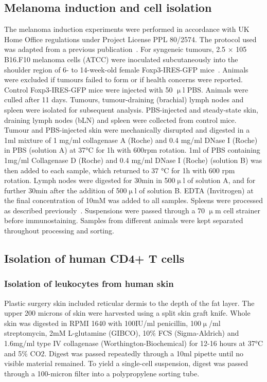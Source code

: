 \subsection{Melanoma induction and cell isolation}	
The melanoma induction experiments were performed in accordance with UK Home Office regulations under Project License PPL 80/2574. The protocol used was adapted from a previous publication~\citep{Riedel2016-gv}. For syngeneic tumours, 2.5 × 105 B16.F10 melanoma cells (ATCC) were inoculated subcutaneously into the shoulder region of 6- to 14-week-old female Foxp3-IRES-GFP mice~\citep{Haribhai2007-tk}. Animals were excluded if tumours failed to form or if health concerns were reported. Control Foxp3-IRES-GFP mice were injected with 50 ${\upmu}$l PBS. Animals were culled after 11 days. Tumours, tumour-draining (brachial) lymph nodes and spleen were isolated for subsequent analysis. PBS-injected and steady-state skin, draining lymph nodes (bLN) and spleen were collected from control mice. Tumour and PBS-injected skin were mechanically disrupted and digested in a 1ml mixture of 1 mg/ml collagenase A (Roche) and 0.4 mg/ml DNase I (Roche) in PBS (solution A) at 37°C for 1h with 600rpm rotation. 1ml of PBS containing 1mg/ml Collagenase D (Roche) and 0.4 mg/ml DNase I (Roche) (solution B) was then added to each sample, which returned to 37 °C for 1h with 600 rpm rotation. Lymph nodes were digested for 30min in 500${\upmu}$l of solution A, and for further 30min after the addition of 500${\upmu}$l of solution B. EDTA (Invitrogen) at the final concentration of 10mM was added to all samples. Spleens were processed as described previously~\citep{Uhlig2006-om}. Suspensions were passed through a 70 ${\upmu}$m cell strainer before immunostaining. Samples from different animals were kept separated throughout processing and sorting.

\subsection{Isolation of human CD4+ T cells}
\subsubsection{Isolation of leukocytes from human skin}
Plastic surgery skin included reticular dermis to the depth of the fat layer. The upper 200 microns of skin were harvested using a split skin graft knife. Whole skin was digested in RPMI 1640 with 100IU/ml penicillin, 100${\upmu}$/ml streptomycin, 2mM L-glutamine (GIBCO), 10${\%}$ FCS (Sigma-Aldrich) and 1.6mg/ml type IV collagenase (Worthington-Biochemical) for 12-16 hours at 37°C and 5${\%}$ CO2. Digest was passed repeatedly through a 10ml pipette until no visible material remained. To yield a single-cell suspension, digest was passed through a 100-micron filter into a polypropylene sorting tube.

